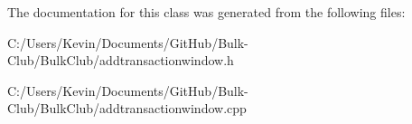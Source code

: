 The documentation for this class was generated from the following files\+:\begin{DoxyCompactItemize}
\item 
C\+:/\+Users/\+Kevin/\+Documents/\+Git\+Hub/\+Bulk-\/\+Club/\+Bulk\+Club/addtransactionwindow.\+h\item 
C\+:/\+Users/\+Kevin/\+Documents/\+Git\+Hub/\+Bulk-\/\+Club/\+Bulk\+Club/addtransactionwindow.\+cpp\end{DoxyCompactItemize}
